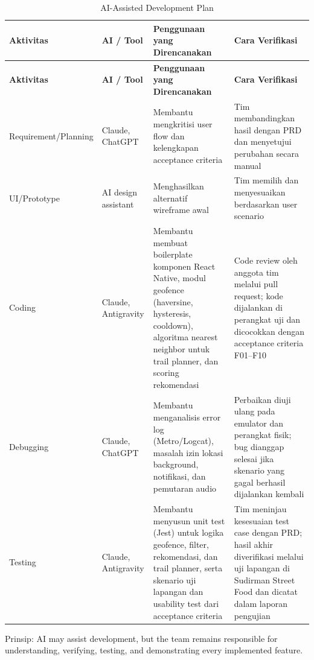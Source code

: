 \begin{longtable}{|L{0.250}|L{0.174}|L{0.298}|L{0.279}|}
\caption{AI-Assisted Development Plan}\\
\hline
{}\textbf{Aktivitas} & \textbf{AI / Tool} & \textbf{Penggunaan yang Direncanakan} & \textbf{Cara Verifikasi} \\ \hline
\endfirsthead
\hline
{}\textbf{Aktivitas} & \textbf{AI / Tool} & \textbf{Penggunaan yang Direncanakan} & \textbf{Cara Verifikasi} \\ \hline
\endhead
Requirement/Planning & Claude, ChatGPT & Membantu mengkritisi user flow dan kelengkapan acceptance criteria & Tim membandingkan hasil dengan PRD dan menyetujui perubahan secara manual \\ \hline
UI/Prototype & AI design assistant & Menghasilkan alternatif wireframe awal & Tim memilih dan menyesuaikan berdasarkan user scenario \\ \hline
Coding & Claude, Antigravity & Membantu membuat boilerplate komponen React Native, modul geofence (haversine, hysteresis, cooldown), algoritma nearest neighbor untuk trail planner, dan scoring rekomendasi & Code review oleh anggota tim melalui pull request; kode dijalankan di perangkat uji dan dicocokkan dengan acceptance criteria F01--F10 \\ \hline
Debugging & Claude, ChatGPT & Membantu menganalisis error log (Metro/Logcat), masalah izin lokasi background, notifikasi, dan pemutaran audio & Perbaikan diuji ulang pada emulator dan perangkat fisik; bug dianggap selesai jika skenario yang gagal berhasil dijalankan kembali \\ \hline
Testing & Claude, Antigravity & Membantu menyusun unit test (Jest) untuk logika geofence, filter, rekomendasi, dan trail planner, serta skenario uji lapangan dan usability test dari acceptance criteria & Tim meninjau kesesuaian test case dengan PRD; hasil akhir diverifikasi melalui uji lapangan di Sudirman Street Food dan dicatat dalam laporan pengujian \\ \hline
\end{longtable}

Prinsip: AI may assist development, but the team remains responsible for understanding, verifying, testing, and demonstrating every implemented feature.
